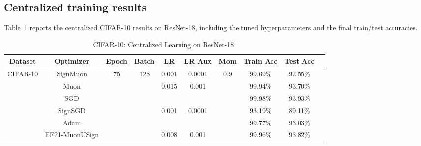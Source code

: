 \documentclass[letterpaper]{article} %
\begin{document}
\subsection{Centralized training results}\label{app:images_cen}
Table~\ref{tab:cifar_central} reports the centralized CIFAR-10 results on ResNet-18, including the tuned hyperparameters and the final train/test accuracies.
\begin{table}[!t]
\centering
\small
\renewcommand{\arraystretch}{1.2}
\begin{tabular}{|c|c|c|c|c|c|c|c|c|c|}
\hline
\textbf{Dataset} & \textbf{Optimizer} & \textbf{Epoch} & \textbf{Batch} & \textbf{LR} & \textbf{LR Aux} & \textbf{Mom} & \textbf{Train Acc} & \textbf{Test Acc} \\
\hline
\multirow{6}{*}{CIFAR-10} & SignMuon & \multirow{6}{*}{75} & \multirow{6}{*}{128} & 0.001 & 0.0001 & \multirow{6}{*}{0.9} & 99.69\% & 92.55\% \\
\cline{2-2} \cline{5-6} \cline{8-9}
 & Muon & & & \multirow{2}{*}{0.015}  & \multirow{2}{*}{0.001} & & 99.94\% & 93.70\% \\
 \cline{2-2} \cline{8-9}
& SGD & & & & & & 99.98\% & 93.93\% \\
\cline{2-2} \cline{5-6} \cline{8-9}
& SignSGD & & & \multirow{2}{*}{0.001}  & \multirow{2}{*}{0.0001}  & & 93.19\% & 89.11\% \\
\cline{2-2} \cline{8-9}
 & Adam & & &  & & & 99.77\% & 93.03\% \\
 \cline{2-2} \cline{5-6} \cline{8-9}
 & EF21-MuonUSign & & & 0.008 & 0.001& & 99.96\% & 93.82\% \\
\hline
\end{tabular}
\caption{CIFAR-10: Centralized Learning on ResNet-18.}
\label{tab:cifar_central}
\end{table}

\end{document}
